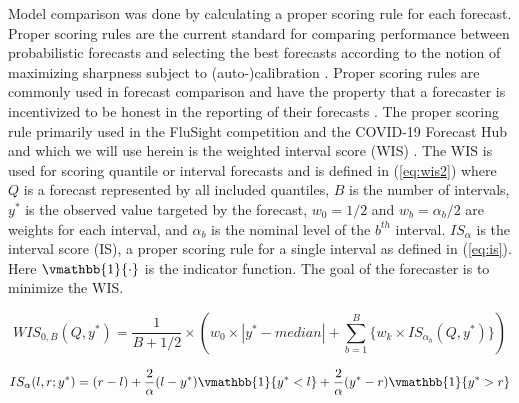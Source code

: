 Model comparison was done by calculating a proper scoring rule for each 
forecast.
Proper scoring rules are the 
current standard for comparing performance between probabilistic forecasts 
and selecting the best forecasts according to the notion of maximizing 
sharpness subject to (auto-)calibration 
\cite[]{gneiting2007probabilistic, tsyplakov2013evaluation}. Proper scoring 
rules are commonly used in forecast comparison and have the property that a 
forecaster is incentivized to be honest in the reporting of their forecasts 
\cite[]{gneiting2007strictly, gneiting2014probabilistic}.
The proper scoring rule primarily used in the FluSight competition and the 
COVID-19 Forecast Hub and which we will use herein is the 
weighted interval score (WIS)
\cite[]{mathis2024evaluation, bracher2021evaluating}.
The WIS is used for scoring quantile or interval 
forecasts 
\cite[]{gneiting2007strictly, gneiting2014probabilistic, bracher2021evaluating} 
and is defined in (\ref{eq:wis2}) where $Q$ is a forecast represented by all 
included quantiles, $B$ is the number of intervals,  $y^*$ is the observed 
value targeted by the forecast, $w_0 = 1/2$ and $w_b = \alpha_b / 2$ are 
weights for each interval, and $\alpha_b$ is the nominal level of the $b^{th}$ 
interval. $IS_{\alpha}$ is the interval score (IS), a proper scoring rule for a 
single interval as defined in (\ref{eq:is}). Here 
$\vmathbb{1}\{\cdot\}$ is the indicator function.
The goal of the forecaster is to 
minimize the WIS.  

\begin{equation}
\label{eq:wis2}
        WIS_{0,B}(Q, y^*) = \frac{1}{B + 1/2} \times (w_0\times |y^* - median| + \sum_{b=1}^B \{w_k \times IS_{\alpha_b}(Q, y^*) \} )
\end{equation}

\begin{equation}
\label{eq:is}
        IS_{\alpha}(l,r;y^*) = (r-l) + \frac{2}{\alpha}(l - y^*)\vmathbb{1}\{y^* < l\} + \frac{2}{\alpha}(y^* - r) \vmathbb{1}\{y^* > r\}
\end{equation}


% 



